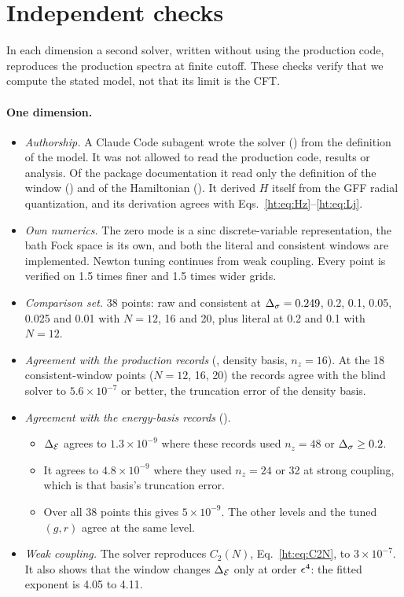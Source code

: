\section{Independent checks}\label{ht:sec:checks}
In each dimension a second solver, written without using the production code, reproduces the production spectra at
finite cutoff. These checks verify that we compute the stated model, not that its limit is the CFT.

\paragraph{One dimension.}\label{ht:d1:checks}
\begin{itemize}
\item \emph{Authorship.} A Claude Code subagent wrote the solver ()
 from the definition of the model. It was not allowed to read the production code, results or analysis. Of the
 package documentation it read only the definition of the window () and of the Hamiltonian
 (). It derived $H$ itself from the GFF radial
 quantization, and its derivation agrees with Eqs.~\eqref{ht:eq:Hz}--\eqref{ht:eq:Lj}.
\item \emph{Own numerics.} The zero mode is a sinc discrete-variable representation, the bath Fock space is its own,
 and both the literal and consistent windows are implemented. Newton tuning continues from weak coupling. Every point
 is verified on 1.5 times finer and 1.5 times wider grids.
\item \emph{Comparison set.} 38 points: raw and consistent at $\Delta_\sigma=0.249$, 0.2, 0.1, 0.05, 0.025 and 0.01 with
 $N=12$, 16 and 20, plus literal at 0.2 and 0.1 with $N=12$.
\item \emph{Agreement with the production records} (, density basis, $n_z=16$). At the 18
 consistent-window points ($N=12$, 16, 20) the records agree with the blind solver to $5.6\times10^{-7}$ or better,
 the truncation error of the density basis.
\item \emph{Agreement with the energy-basis records} ().
 \begin{itemize}
 \item $\Delta_{\mathcal E}$ agrees to $1.3\times10^{-9}$ where these records used $n_z=48$ or $\Delta_\sigma\ge0.2$.
 \item It agrees to $4.8\times10^{-9}$ where they used $n_z=24$ or 32 at strong coupling, which is that basis's
 truncation error.
 \item Over all 38 points this gives $5\times10^{-9}$. The other levels and the tuned $(g,r)$ agree at the same level.
 \end{itemize}
\item \emph{Weak coupling.} The solver reproduces $C_2(N)$, Eq.~\eqref{ht:eq:C2N}, to $3\times10^{-7}$. It also shows
 that the window changes $\Delta_{\mathcal E}$ only at order $\epsilon^4$: the fitted exponent is 4.05 to 4.11.
\end{itemize}





